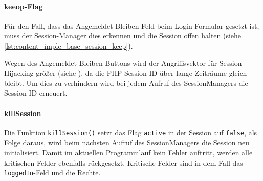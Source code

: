 \paragraph{keeop-Flag\\}
Für den Fall, dass das Angemeldet-Bleiben-Feld beim Login-Formular gesetzt ist, muss der Session-Manager dies erkennen und die Session offen halten (siehe \autoref{lst:content_imple_base_session_keep}).


Wegen des Angemeldet-Bleiben-Buttons wird der Angriffsvektor für Session-Hijacking größer (siehe ), da die PHP-Session-ID über lange Zeiträume gleich bleibt. Um dies zu verhindern wird bei jedem Aufruf des SessionManagers die Session-ID erneuert.


\paragraph{killSession\\}
Die Funktion \texttt{killSession()} setzt das Flag \texttt{active} in der Session auf \texttt{false}, als Folge daraus, wird beim nächsten Aufruf des SessionManagers die Session neu initialisiert. Damit im aktuellen Programmlauf kein Fehler auftritt, werden alle kritischen Felder ebenfalls rückgesetzt. Kritische Felder sind in dem Fall das \texttt{loggedIn}-Feld und die Rechte.


